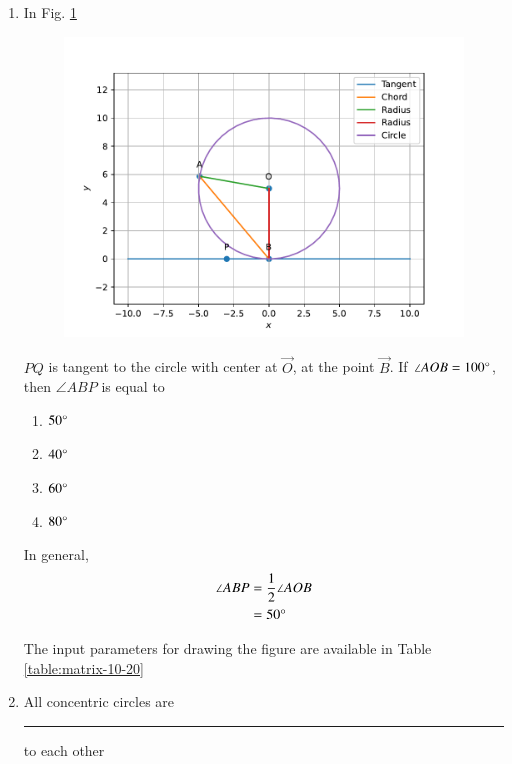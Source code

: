 \documentclass[journal,12pt,twocolumn]{IEEEtran}
\renewcommand\thesection{\arabic{section}}
\begin{document}
\begin{enumerate}[label=\thesection.\arabic*.,ref=\thesection.\theenumi]
\item In Fig.
	  \ref{fig:matrix-10-20.pdf}
  \begin{figure}
	  \centering 
	  \includegraphics[width=\columnwidth]{figs/matrix-10-20.pdf}
	  \caption{}
	  \label{fig:matrix-10-20.pdf}
	  \end{figure}
	${PQ}$ is tangent to the circle with center at $\vec{O}$, at the point $\vec{B}$. If $\angle{AOB} = 100\degree$, then $\angle{ABP}$ is equal to
\begin{enumerate}
\item $50\degree$
\item $40\degree$
\item $60\degree$
\item $80\degree$
\end{enumerate}

 \solution  In general,
	\begin{align}
		\angle{ABP} &= \frac{1}{2} \angle{AOB} 
		\\
		&= 50 \degree
	\end{align}

	The input parameters for drawing the figure are available in 
Table	  \ref{table:matrix-10-20}
\begin{table}[ht!]
	
\caption{}
\label{table:matrix-10-20}	
\end{table}

\item All concentric circles are \rule{1.5cm}{0.15mm} to each other\\
\end{enumerate}
\end{document}
